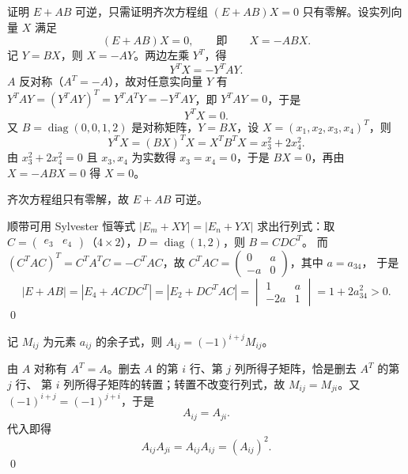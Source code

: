 \begin{solution}
证明 $E+AB$ 可逆，只需证明齐次方程组 $(E+AB)X=0$ 只有零解。设实列向量 $X$ 满足
\[
(E+AB)X=0,\qquad\text{即}\qquad X=-ABX .
\]
记 $Y=BX$，则 $X=-AY$。两边左乘 $Y^{T}$，得
\[
Y^{T}X=-Y^{T}AY .
\]
$A$ 反对称（$A^{T}=-A$），故对任意实向量 $Y$ 有
$Y^{T}AY=(Y^{T}AY)^{T}=Y^{T}A^{T}Y=-Y^{T}AY$，即 $Y^{T}AY=0$，于是
\[
Y^{T}X=0 .
\]
又 $B=\operatorname{diag}(0,0,1,2)$ 是对称矩阵，$Y=BX$，设 $X=(x_{1},x_{2},x_{3},x_{4})^{T}$，则
\[
Y^{T}X=(BX)^{T}X=X^{T}B^{T}X=x_{3}^{2}+2x_{4}^{2}.
\]
由 $x_{3}^{2}+2x_{4}^{2}=0$ 且 $x_{3},x_{4}$ 为实数得 $x_{3}=x_{4}=0$，于是 $BX=0$，再由 $X=-ABX=0$ 得 $X=0$。

齐次方程组只有零解，故 $E+AB$ 可逆。

顺带可用 Sylvester 恒等式 $|E_{m}+XY|=|E_{n}+YX|$ 求出行列式：取
$C=\begin{pmatrix}e_{3}&e_{4}\end{pmatrix}$（$4\times2$），$D=\operatorname{diag}(1,2)$，则 $B=CDC^{T}$。
而 $(C^{T}AC)^{T}=C^{T}A^{T}C=-C^{T}AC$，故 $C^{T}AC=\begin{pmatrix}0&a\\-a&0\end{pmatrix}$，其中 $a=a_{34}$，
于是
\[
|E+AB|=|E_{4}+ACDC^{T}|=|E_{2}+DC^{T}AC|
=\begin{vmatrix}1&a\\-2a&1\end{vmatrix}=1+2a_{34}^{2}>0 .
\]
\qed
\end{solution}

\begin{solution}
记 $M_{ij}$ 为元素 $a_{ij}$ 的余子式，则 $A_{ij}=(-1)^{i+j}M_{ij}$。

由 $A$ 对称有 $A^{T}=A$。删去 $A$ 的第 $i$ 行、第 $j$ 列所得子矩阵，恰是删去 $A^{T}$ 的第 $j$ 行、
第 $i$ 列所得子矩阵的转置；转置不改变行列式，故 $M_{ij}=M_{ji}$。又 $(-1)^{i+j}=(-1)^{j+i}$，于是
\[
A_{ij}=A_{ji}.
\]
代入即得
\[
A_{ij}A_{ji}=A_{ij}A_{ij}=(A_{ij})^{2}.
\]
\qed
\end{solution}

